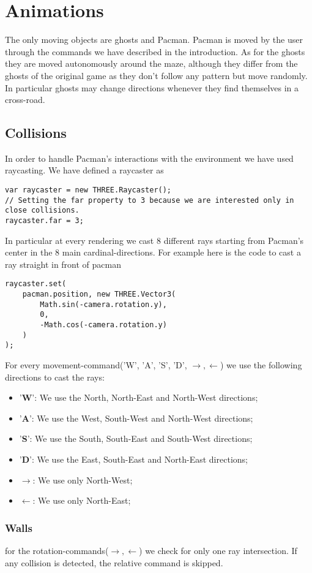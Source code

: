\documentclass[a4paper,oneside]{report}
\begin{document}
\chapter{Animations}
The only moving objects are ghosts and Pacman. Pacman is moved by the user through the commands we have described in the introduction. As for the ghosts they are moved autonomously around the maze, although they differ from the ghosts of the original game as they don't follow any pattern but move randomly. In particular ghosts may change directions whenever they find themselves in a cross-road.
\section{Collisions}
In order to handle Pacman's interactions with the environment we have used raycasting. 
We have defined a raycaster as
\begin{lstlisting}
var raycaster = new THREE.Raycaster();
// Setting the far property to 3 because we are interested only in close collisions.
raycaster.far = 3;
\end{lstlisting}
In particular at every rendering we cast 8 different rays starting from Pacman's center in the 8 main cardinal-directions. For example here is the code to cast a ray straight in front of pacman
\begin{lstlisting}
raycaster.set(
	pacman.position, new THREE.Vector3(
		Math.sin(-camera.rotation.y),
		0,
		-Math.cos(-camera.rotation.y)
	)
);
\end{lstlisting}
For every movement-command('W', 'A', 'S', 'D', $\rightarrow , \leftarrow$) we use the following directions to cast the rays:
\begin{itemize}
\item '\textbf{W}': We use the North, North-East and North-West directions;
\item '\textbf{A}': We use the West, South-West and North-West directions;
\item '\textbf{S}': We use the South, South-East and South-West directions;
\item '\textbf{D}': We use the East, South-East and North-East directions;
\item $\rightarrow$: We use only North-West;
\item $\leftarrow$: We use only North-East;
\end{itemize}
\subsection{Walls}
for the rotation-commands($\rightarrow , \leftarrow$) we check for only one ray intersection. If any collision is detected, the relative command is skipped.
\end{document}
